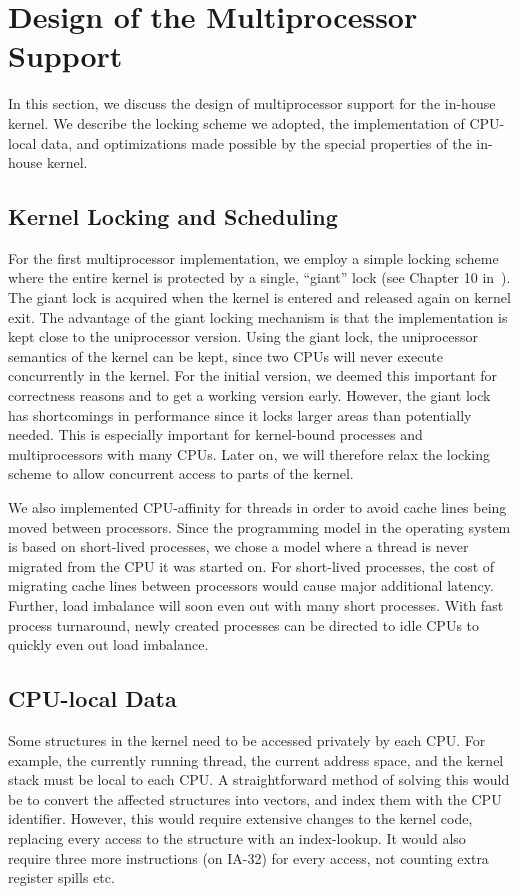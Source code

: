 \section{Design of the Multiprocessor Support}
\label{sec:smp_design}
In this section, we discuss the design of multiprocessor support for the
in-house kernel.  We describe the locking scheme we adopted, the
implementation of CPU-local data, and optimizations made possible by the
special properties of the in-house kernel.

\subsection{Kernel Locking and Scheduling}
For the first multiprocessor implementation, we employ a simple locking scheme
where the entire kernel is protected by a single, ``giant'' lock (see Chapter
10 in~\cite{schimmel94unix}). The giant lock is acquired when the kernel is
entered and released again on kernel exit. The advantage of the giant locking
mechanism is that the implementation is kept close to the uniprocessor
version. Using the giant lock, the uniprocessor semantics of the kernel can be
kept, since two CPUs will never execute concurrently in the kernel. For the
initial version, we deemed this important for correctness reasons and to get a
working version early. However, the giant lock has shortcomings in performance
since it locks larger areas than potentially needed. This is especially
important for kernel-bound processes and multiprocessors with many CPUs. Later
on, we will therefore relax the locking scheme to allow concurrent access to
parts of the kernel.

We also implemented CPU-affinity for threads in order to avoid cache lines
being moved between processors. Since the programming model in the operating
system is based on short-lived processes, we chose a model where a thread is
never migrated from the CPU it was started on. For short-lived processes, the
cost of migrating cache lines between processors would cause major additional
latency.  Further, load imbalance will soon even out with many short
processes. With fast process turnaround, newly created processes can be
directed to idle CPUs to quickly even out load imbalance.

\subsection{CPU-local Data}
Some structures in the kernel need to be accessed privately by each CPU. For
example, the currently running thread, the current address space, and the
kernel stack must be local to each CPU. A straightforward method of solving
this would be to convert the affected structures into vectors, and index them
with the CPU identifier. However, this would require extensive changes to the
kernel code, replacing every access to the structure with an index-lookup. It
would also require three more instructions (on IA-32) for every access, not
counting extra register spills etc.


